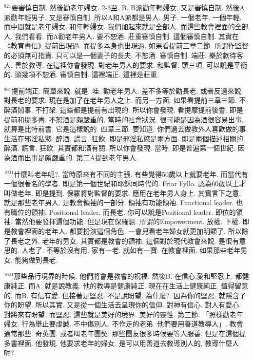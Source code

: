 \documentclass{book}
\begin{document}
$^{921}$要審慎自制.
然後勸老年婦女.
2-3至.
B.
B派勸年輕婦女.
又是審慎自制.
然後A派勸年輕男子.
又是審慎自制.
所以A和A派都是男人.
男子.
一個老年.
一個年輕.
而中間就是老年婦女.
和年輕婦女.
我們加起來就是全部人.
而這些教會裡面的全部人.
我們看看.
而A勸老年男人.
要不恕酒.
莊重審慎自制.
這個審慎自制.
其實在《教育書信》提前出現過.
而提多本身也出現過.
如果看提前三章二節.
所謂作監督的必須無可指責.
只可以是一個妻子的長夫.
不恕酒.
審慎自制.
端莊.
樂於款待客人.
善於教導.
在這裡你會發現.
對老年男人的要求.
和監督.
頭三項.
可以說是平衡的.
頭幾項不恕酒.
審慎自制.
這裡端正.
這裡是莊重.

$^{961}$提前端正.
簡單來說.
就是.
哇.
勸老年男人.
差不多等於勸長老.
或者反過來說.
對長老的要求.
現在是加了在老年男人之上.
而另一方面.
如果看提前三章三節.
不醉酒鬧事.
不打架.
這些都是提前有出現的.
所以你會發現.
看提摩提前後書.
即是提前和提多書.
不恕酒是頗嚴重的.
當時的社會狀況.
很可能是因為酒很容易出事.
就算是比特前書.
它是這樣說的.
四章三節.
要知道.
你們過去做教外人喜歡做的事.
生活在邪淫私慾.
醉酒.
謊言.
狂飲.
即是邪淫私慾是兩方面.
即是兩個描述相關的.
醉酒.
謊言.
狂飲.
其實都和酒有關.
所以你會發現.
當時.
即是普遍第一個世紀.
因為酒而出事是頗嚴重的.
第二A提到老年男人.

$^{1001}$什麼叫老年呢?.
當時原來有不同的主張.
有些覺得50歲以上就要老年.
而當代有一個很著名的學者.
即是第一個世紀和耶穌同時代的.
Friar Fyllo.
認為60歲以上才叫做老年.
即是提到.
保羅將對監督的要求.
應用在老年男人身上.
其實言下之意.
就是那些老年男人.
是教會領袖的一部分.
領袖有功能領袖.
Functional leader.
也有職位的領袖.
Positional leader.
而長老.
你可以說是Positional leader.
即位的領袖.
當然他要發揮這個功能.
但是現在保羅想.
所謂的Empowerment.
放權.
下權.
即是教會裡面的老年人.
都要扮演這個角色.
一會兒看老年婦女就更加明顯了.
所以除了長老之外.
老年的男女.
其實都是教會的領袖.
這個對於現代教會來說.
是很有意思的.
人老了.
不等於沒有用.
家有一老.
就如有一寶.
在教會裡面.
如果那些老年男女.
能夠做到長老.

$^{1041}$那些品行境界的時候.
他們將會是教會的祝福.
然後B.
在信心,愛和堅忍上.
都健康純正.
而A.
就是說教義.
他的教導是健康純正.
現在在生活上健康純正.
值得留意的.
而B.
有信有愛.
但接著是堅忍.
不是說盼望.
為什麼?.
因為你的堅忍.
就隱含了你的盼望.
所以其實.
又是從一個生活去呈現你的信仰.
對神有信心.
對人有愛心.
對將來有盼望.
而堅忍.
這些就是美好的境界.
美好的靈性.
第三節.
「照樣勸老年婦女.
行為舉止要虔誠.
不中傷別人.
不作走的老弟.
他們要用善道教導人」.
教會通常那些.
奇英團.
或者叫老年團契.
那些團友很多時候要等人服善.
但是在這個提多書裡面.
他發現.
他要求老年的婦女.
是可以用善道去教導別人的.
教導什麼人呢?.
\end{document}
